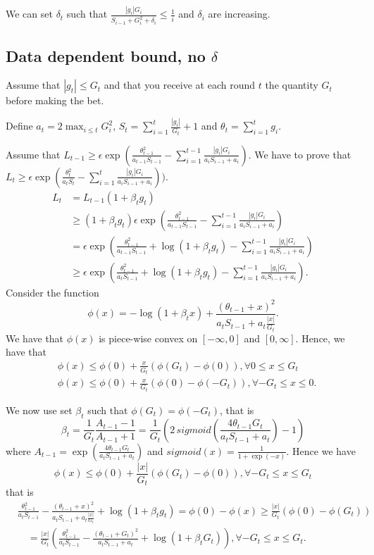 We can set $\delta_t$ such that $\frac{|g_i| G_i}{S_{i-1} + G^2_i +\delta_i}\leq \frac{1}{i}$ and $\delta_i$ are increasing.


\subsection{Data dependent bound, no $\delta$}

Assume that $|g_t|\leq G_t$ and that you receive at each round $t$ the quantity $G_t$ before making the bet.

Define $a_t=2 \max_{i\leq t} G_i^2$, $S_t = \sum_{i=1}^t \frac{|g_i|}{G_t} + 1$ and $\theta_t=\sum_{i=1}^t g_i$.

Assume that $L_{t-1}\geq \epsilon \exp(\frac{\theta_{t-1}^2}{a_{t-1} S_{t-1}}- \sum_{i=1}^{t-1} \frac{|g_i| G_i}{a_i S_{i-1} + a_i})$.
We have to prove that $L_{t}\geq \epsilon \exp(\frac{\theta_{t}^2}{a_{t} S_t}- \sum_{i=1}^{t} \frac{|g_i| G_i}{a_i S_{i-1} + a_i}))$.
\begin{align}
L_{t} &= L_{t-1} (1+\beta_t g_t) \\
&\geq (1+\beta_t g_t) \epsilon \exp(\frac{\theta_{t-1}^2}{a_{t-1} S_{t-1}}- \sum_{i=1}^{t-1} \frac{|g_i| G_i}{a_i S_{i-1} + a_i }) \\
&=  \epsilon \exp(\frac{\theta_{t-1}^2}{a_{t-1} S_{t-1}}+\log(1+\beta_t g_t)- \sum_{i=1}^{t-1} \frac{|g_i| G_i}{a_i S_{i-1} + a_i}) \\
&\geq  \epsilon \exp(\frac{\theta_{t-1}^2}{a_{t} S_{t-1}}+\log(1+\beta_t g_t)- \sum_{i=1}^{t-1} \frac{|g_i| G_i}{a_i S_{i-1} + a_i}).
\end{align}
Consider the function 
\[
\phi(x)=-\log(1+\beta_t x) + \frac{(\theta_{t-1}+x)^2}{a_t S_{t-1} + a_t \frac{|x|}{G_t}}.
\]
We have that $\phi(x)$ is piece-wise convex on $[-\infty,0]$ and $[0,\infty]$. Hence, we have that
\begin{align}
&\phi(x) \leq \phi(0)+\frac{x}{G_t} (\phi(G_t)-\phi(0)), \forall 0 \leq x\leq G_t\\
&\phi(x) \leq \phi(0)+\frac{x}{G_t} (\phi(0)-\phi(-G_t)), \forall -G_t \leq x\leq 0.
\end{align}

We now use set $\beta_t$ such that $\phi(G_t)=\phi(-G_t)$, that is
\[
\beta_t = \frac{1}{G_t} \frac{A_{t-1}-1}{A_{t-1}+1} 
= \frac{1}{G_t} \left(2 \, sigmoid\left(\frac{4 \theta_{t-1} G_t}{a_{t} S_{t-1} + a_t}\right)-1\right)
\]
where $A_{t-1}=\exp\left(\frac{4 \theta_{t-1} G_t}{a_{t} S_{t-1} + a_t}\right)$ and
$sigmoid (x) =\frac{1}{1+\exp(-x)}$.
Hence we have
\[
\phi(x) \leq \phi(0)+\frac{|x|}{G_t} (\phi(G_t)-\phi(0)), \forall -G_t \leq x\leq G_t
\]
that is
\begin{align}
&\frac{\theta_{t-1}^2}{a_t S_{t-1}}-\frac{(\theta_{t-1}+x)^2}{a_t S_{t-1}+a_t \frac{|x|}{G_t}} + \log(1+\beta_t g_t) = \phi(0) - \phi(x) 
\geq \frac{|x|}{G_t} (\phi(0) - \phi(G_t)) \\
&\quad = \frac{|x|}{G_t} (\frac{\theta_{t-1}^2}{a_t S_{t-1}} - \frac{(\theta_{t-1}+G_t)^2}{a_t S_{t-1} + a_t} + \log(1+\beta_t G_t)), \forall -G_t \leq x\leq G_t.
\end{align}



